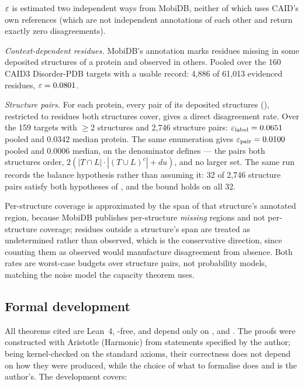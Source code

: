 $\varepsilon$ is estimated two independent ways from MobiDB, neither of which uses
CAID's own references (which are not independent annotations of each other and
return exactly zero disagreements).

\emph{Context-dependent residues.} MobiDB's
 annotation marks
residues missing in some deposited structures of a protein and observed in
others. Pooled over the 160 CAID3 Disorder-PDB targets with a usable record:
4{,}886 of 61{,}013 evidenced residues, $\varepsilon = 0.0801$.

\emph{Structure pairs.} For each protein, every pair of its deposited structures
(), restricted to
residues both structures cover, gives a direct disagreement rate. Over the 159
targets with $\ge 2$ structures and 2{,}746 structure pairs:
$\varepsilon_{\text{label}} = 0.0651$ pooled and 0.0342 median protein. The same
enumeration gives $\varepsilon_{\text{pair}} = 0.0100$ pooled and 0.0006 median, on the
denominator  defines --- the pairs both structures
order, $2(|T \cap L|\cdot|(T \cup L)^{c}| + du)$, and no larger set. The same run
records the balance hypothesis rather than assuming it: 32 of 2{,}746 structure
pairs satisfy both hypotheses of , and the bound
holds on all 32.

Per-structure coverage is approximated by the span of that structure's annotated
region, because MobiDB publishes per-structure \emph{missing} regions and not
per-structure coverage; residues outside a structure's span are treated as
undetermined rather than observed, which is the conservative direction, since
counting them as observed would manufacture disagreement from absence. Both
rates are worst-case budgets over structure pairs, not probability models,
matching the noise model the capacity theorem uses.

\subsection*{Formal development}

All theorems cited are Lean~4, -free, and depend only on
,  and . The proofs were
constructed with Aristotle (Harmonic) from statements specified by the author;
being kernel-checked on the standard axioms, their correctness does not depend
on how they were produced, while the choice of what to formalise does and is
the author's. The development covers:

